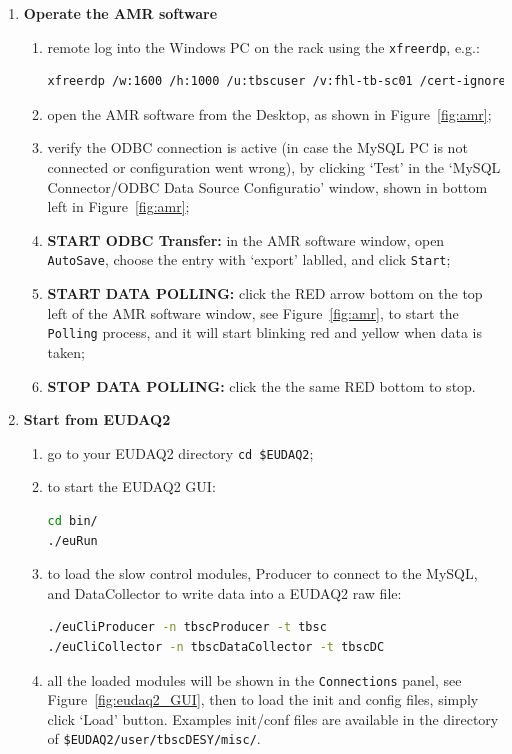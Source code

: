 \documentclass[a4paper,12pt]{scrartcl}
\begin{document}
\begin{enumerate}[label=(\roman*)]
  \item \textbf{Operate the AMR software}
  \begin{enumerate}
    \item remote log into the Windows PC on the rack using the \verb|xfreerdp|, e.g.:
    \begin{lstlisting}[language=bash]
xfreerdp /w:1600 /h:1000 /u:tbscuser /v:fhl-tb-sc01 /cert-ignore    \end{lstlisting}
    \item open the AMR software from the Desktop, as shown in Figure~\ref{fig:amr};
    \item verify the ODBC connection is active (in case the MySQL PC is not connected or configuration went wrong), by clicking `Test' in the `MySQL Connector/ODBC Data Source Configuratio' window, shown in bottom left in Figure~\ref{fig:amr};
    \item \textbf{START ODBC Transfer:} in the AMR software window, open \texttt{AutoSave}, choose the entry with `export' lablled, and click \texttt{Start};
    \item \textbf{START DATA POLLING:} click the RED arrow bottom on the top left of the AMR software window, see Figure~\ref{fig:amr}, to start the \texttt{Polling} process, and it will start blinking red and yellow when data is taken;
    \item \textbf{STOP DATA POLLING:} click the the same RED bottom to stop.
  \end{enumerate}
  \item \textbf{Start from EUDAQ2}
  \begin{enumerate}
    \item go to your EUDAQ2 directory \verb|cd $EUDAQ2|;
    \item to start the EUDAQ2 GUI:
    \begin{lstlisting}[language=bash]
cd bin/
./euRun    \end{lstlisting}
    \item to load the slow control modules, Producer to connect to the MySQL, and DataCollector to write data into a EUDAQ2 raw file:
    \begin{lstlisting}[language=bash]
./euCliProducer -n tbscProducer -t tbsc
./euCliCollector -n tbscDataCollector -t tbscDC    \end{lstlisting}
    \item all the loaded modules will be shown in the \texttt{Connections} panel, see Figure~\ref{fig:eudaq2_GUI}, then to load the init and config files, simply click `Load' button. Examples init/conf files are available in the directory of \verb|$EUDAQ2/user/tbscDESY/misc/|.
  \end{enumerate}
\end{enumerate}
\end{document}
